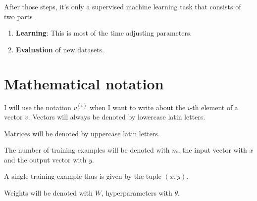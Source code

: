 After those steps, it's only a supervised machine learning task that consists of
two parts

\begin{enumerate}
    \item \textbf{Learning}: This is most of the time adjusting parameters.
    \item \textbf{Evaluation} of new datasets.
\end{enumerate}

\section{Mathematical notation}
I will use the notation $v^{(i)}$ when I want to write about the $i$-th element
of a vector $v$. Vectors will always be denoted by lowercase latin letters.

Matrices will be denoted by uppercase latin letters.

The number of training examples will be denoted with $m$, the input vector with
$x$ and the output vector with $y$.

A single training example thus is given by the tuple $(x, y)$.

Weights will be denoted with $W$, hyperparameters with $\theta$.